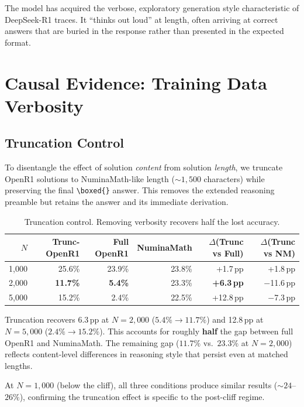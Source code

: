 \documentclass{article}
\begin{document}
The model has acquired the verbose, exploratory generation style characteristic of DeepSeek-R1 traces. It ``thinks out loud'' at length, often arriving at correct answers that are buried in the response rather than presented in the expected format.

\section{Causal Evidence: Training Data Verbosity}
\label{sec:causal}

\subsection{Truncation Control}

To disentangle the effect of solution \emph{content} from solution \emph{length}, we truncate OpenR1 solutions to NuminaMath-like length (${\sim}1{,}500$ characters) while preserving the final \texttt{\textbackslash boxed\{\}} answer. This removes the extended reasoning preamble but retains the answer and its immediate derivation.

\begin{table}[h]
\centering
\caption{Truncation control. Removing verbosity recovers half the lost accuracy.}
\label{tab:truncation}
\small
\begin{tabular}{@{}rrrrrr@{}}
\toprule
$N$ & Trunc-OpenR1 & Full OpenR1 & NuminaMath & $\Delta$(Trunc vs Full) & $\Delta$(Trunc vs NM) \\
\midrule
1,000 & 25.6\% & 23.9\% & 23.8\% & +1.7\,pp & +1.8\,pp \\
2,000 & \textbf{11.7\%} & \textbf{5.4\%} & 23.3\% & \textbf{+6.3\,pp} & $-$11.6\,pp \\
5,000 & 15.2\% & 2.4\% & 22.5\% & +12.8\,pp & $-$7.3\,pp \\
\bottomrule
\end{tabular}
\end{table}

Truncation recovers 6.3\,pp at $N{=}2{,}000$ ($5.4\% \to 11.7\%$) and 12.8\,pp at $N{=}5{,}000$ ($2.4\% \to 15.2\%$). This accounts for roughly \textbf{half} the gap between full OpenR1 and NuminaMath. The remaining gap ($11.7\%$ vs.\ $23.3\%$ at $N{=}2{,}000$) reflects content-level differences in reasoning style that persist even at matched lengths.

At $N{=}1{,}000$ (below the cliff), all three conditions produce similar results (${\sim}24$--$26\%$), confirming the truncation effect is specific to the post-cliff regime.
\end{document}

